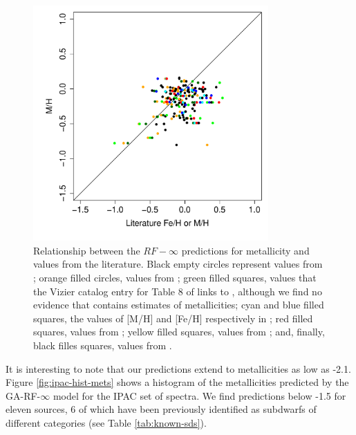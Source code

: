 \begin{figure}
 \begin{center}
 \includegraphics[width=9cm]{figs/ipac-figs/M-RFInf.pdf}
 \caption{Relationship between the $RF-\infty$ predictions for 
 	metallicity and values from the literature. 
 	Black empty circles represent values from \cite{cesetti}
 	; orange filled circles, values from \cite{NevesIII};  green filled 
 	squares, values that the Vizier catalog entry for Table 8 of 
 	\cite{NevesIII} links to \cite{Jao}, although we find no evidence that \cite{Jao} 
 	contains estimates of metallicities; cyan and blue filled squares, the values 
 	of [M/H] and [Fe/H] respectively in \cite{RA2012}; red filled squares, values 
 	from \cite{Mann2015}; yellow filled squares,  values from \cite{Newton2014}; and, 
 	finally, black filles squares, values from \cite{Gaidos2015}.}
 \label{fig:ipac_mt}
 \end{center}
\end{figure}


It is interesting to note that our predictions extend to metallicities
as low as -2.1. Figure \ref{fig:ipac-hist-mets} shows a histogram of
the metallicities predicted by the GA-RF-$\infty$ model for the IPAC
set of spectra. We find predictions below -1.5 for eleven sources, 6
of which have been previously identified as subdwarfs of different
categories (see Table \ref{tab:known-sds}).

